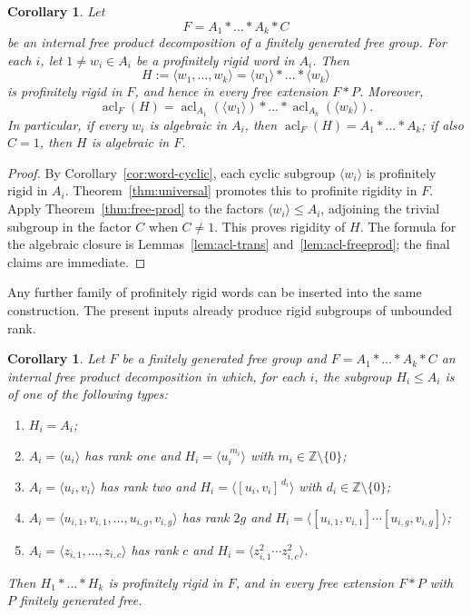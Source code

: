 \documentclass[11pt]{amsart}
\theoremstyle{plain}
\newtheorem{corollary}[theorem]{Corollary}
\theoremstyle{definition}
\newcommand{\acl}{\operatorname{acl}}
\begin{document}
\begin{corollary}\label{cor:assembly}
Let
\[
  F=A_1*\dots*A_k*C
\]
be an internal free product decomposition of a finitely generated free group.
For each $i$, let $1\neq w_i\in A_i$ be a profinitely rigid word in $A_i$.  Then
\[
  H:=\langle w_1,\dots,w_k\rangle
    =\langle w_1\rangle*\dots*\langle w_k\rangle
\]
is profinitely rigid in $F$, and hence in every free extension $F*P$.
Moreover,
\[
  \acl_F(H)=\acl_{A_1}(\langle w_1\rangle)*\dots*
            \acl_{A_k}(\langle w_k\rangle).
\]
In particular, if every $w_i$ is algebraic in $A_i$, then
$\acl_F(H)=A_1*\dots*A_k$; if also $C=1$, then $H$ is algebraic in $F$.
\end{corollary}
\begin{proof}
By Corollary~\ref{cor:word-cyclic}, each cyclic subgroup $\langle w_i\rangle$
is profinitely rigid in $A_i$.  Theorem~\ref{thm:universal} promotes this to
profinite rigidity in $F$.  Apply Theorem~\ref{thm:free-prod} to the factors
$\langle w_i\rangle\le A_i$, adjoining the trivial subgroup in the factor $C$
when $C\neq1$.  This proves rigidity of $H$.  The formula for the algebraic
closure is Lemmas~\ref{lem:acl-trans} and~\ref{lem:acl-freeprod}; the final
claims are immediate.
\end{proof}


Any further family of profinitely rigid words can be inserted into the same
construction.  The present inputs already
produce rigid subgroups of unbounded rank.

\begin{corollary}\label{cor:examples}
Let $F$ be a finitely generated free group and $F=A_1*\dots*A_k*C$ an internal
free product decomposition in which, for each $i$, the subgroup $H_i\le A_i$ is
of one of the following types:
\begin{enumerate}
\item[(a)] $H_i=A_i$;
\item[(b)] $A_i=\langle u_i\rangle$ has rank one and
           $H_i=\langle u_i^{\,m_i}\rangle$ with
           $m_i\in\mathbb Z\setminus\{0\}$;
\item[(c)] $A_i=\langle u_i,v_i\rangle$ has rank two and
           $H_i=\bigl\langle[u_i,v_i]^{\,d_i}\bigr\rangle$ with
           $d_i\in\mathbb Z\setminus\{0\}$;
\item[(d)] $A_i=\langle u_{i,1},v_{i,1},\dots,u_{i,g},v_{i,g}\rangle$ has rank
           $2g$ and $H_i=\bigl\langle[u_{i,1},v_{i,1}]\cdots[u_{i,g},v_{i,g}]
           \bigr\rangle$;
\item[(e)] $A_i=\langle z_{i,1},\dots,z_{i,c}\rangle$ has rank $c$ and
           $H_i=\bigl\langle z_{i,1}^{2}\cdots z_{i,c}^{2}\bigr\rangle$.
\end{enumerate}
Then $H_1*\dots*H_k$ is profinitely rigid in $F$, and in every free extension
$F*P$ with $P$ finitely generated free.
\end{corollary}
\end{document}
